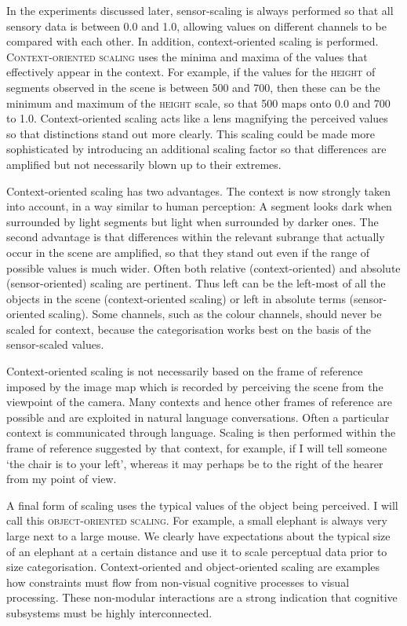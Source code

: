 In the experiments discussed later, 
sensor-scaling is always performed so that all sensory data
is between 0.0 and 1.0, allowing values on different channels 
to be compared with 
each other. In addition, context-oriented scaling is performed.
{\scshape Context-oriented scaling} uses the minima and maxima of the 
values that effectively appear in the context.
For example, if the values for the \textsc{height} of segments 
observed in the scene is between 500 and 700, 
then these can be the minimum and maximum of the 
\textsc{height} scale, so that 500 maps onto 0.0 and 700 to 1.0. 
Context-oriented scaling acts like a lens
magnifying the perceived values so that distinctions
stand out more clearly. This scaling could 
be made more sophisticated by introducing an additional scaling factor so that 
differences are amplified but not necessarily blown up to their extremes. 

Context-oriented scaling has two advantages. The 
context is now strongly taken into
account, in a way similar to human perception: A segment
looks dark when surrounded by light segments but
light when surrounded by darker ones. The second advantage is 
that differences within the relevant subrange that 
actually occur in the scene are amplified, so that 
they stand out even if the range of possible values is
much wider. Often both relative (context-oriented) 
and absolute (sensor-oriented) scaling 
are pertinent. Thus left can be
the left-most of all the objects in the scene (context-oriented
scaling) or left in absolute terms (sensor-oriented scaling). 
Some channels, such as the colour channels, should never be scaled
for context, because the categorisation works best on the basis of 
the sensor-scaled values. 

Context-oriented scaling is not necessarily based on the 
frame of reference imposed by the image map which is 
recorded by perceiving the scene from the viewpoint of 
the camera. Many contexts and hence other frames of reference
are possible and are exploited in natural language 
conversations. Often a particular context is communicated through 
language. Scaling is then performed within the
frame of reference suggested by that context, 
for example, if I will tell someone `the chair is to
your left', whereas it may perhaps be to the right of the
hearer from my point of view. 

A final form of scaling uses the typical values of the object being 
perceived. I will call this {\scshape object-oriented scaling}. 
For example, a small elephant is always
very large next to a large mouse. We clearly
have expectations about the typical size of an elephant at
a certain distance and use it to scale
perceptual data prior to size 
categorisation. Context-oriented and object-oriented scaling
are examples how constraints must flow 
from non-visual cognitive processes to visual processing. 
These non-modular interactions are a strong
indication that cognitive subsystems must be highly 
interconnected. 

